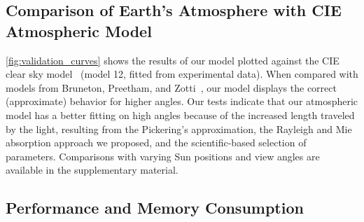 \documentclass[journal]{vgtc}                %
\newcommand{\joncomment}[1]{\textbf{[JC~} \textcolor{red}{#1} \textbf{~]}}
\begin{document}
\subsection{Comparison of Earth's Atmosphere with CIE Atmospheric Model}\label{sec:cie_model}

\autoref{fig:validation_curves} shows the results of our model plotted against the CIE clear sky model~\cite{Darula:2002} (model 12, fitted from experimental data). When compared with models from Bruneton, Preetham, and Zotti~\cite{BrunetonNeyret:2008, Preetham:1999, Zotti:2007}, our model displays the correct (approximate) behavior for higher angles. %
Our tests indicate that our atmospheric model has a better fitting on high angles because of the increased length traveled by the light, resulting from the Pickering's approximation, the Rayleigh and Mie absorption approach we proposed, and the scientific-based selection of parameters. Comparisons with varying Sun positions and view angles are available in the supplementary material.







\vspace*{-1mm}
\subsection{Performance and Memory Consumption}

\end{document}
